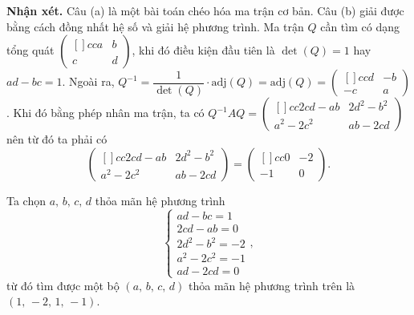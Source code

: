 \textbf{Nhận xét. }Câu (a) là một bài toán chéo hóa ma trận cơ bản. Câu (b) giải được bằng cách đồng nhất hệ số và giải hệ phương trình. Ma trận $Q$ cần tìm có dạng tổng quát $\begin{pmatrix}[]{cc}
    a & b \\
    c & d 
\end{pmatrix}$, khi đó điều kiện đầu tiên là $\det(Q) = 1$ hay $ad - bc = 1$. Ngoài ra, $Q^{-1} = \dfrac{1}{\det (Q)} \cdot \text{adj}(Q) = \text{adj}(Q) = \begin{pmatrix}[]{cc}
    d & -b \\
    -c & a 
\end{pmatrix}$. Khi đó bằng phép nhân ma trận, ta có $Q^{-1}AQ = \begin{pmatrix}[]{cc}
    2cd-ab & 2d^2-b^2 \\
    a^2-2c^2 & ab-2cd 
\end{pmatrix}$ nên từ đó ta phải có $$\begin{pmatrix}[]{cc}
    2cd-ab & 2d^2-b^2 \\
    a^2-2c^2 & ab-2cd 
\end{pmatrix} = \begin{pmatrix}[]{cc}
    0 & -2 \\
    -1 & 0 
\end{pmatrix}.$$ 

Ta chọn $a,\,b,\,c,\,d$ thỏa mãn hệ phương trình $$\begin{cases}
    ad - bc = 1 \\
    2cd - ab = 0 \\
    2d^2 - b^2 = -2 \\
    a^2 - 2c^2 = -1 \\
    ad - 2cd = 0
\end{cases},$$
từ đó tìm được một bộ $(a,\,b,\,c,\,d)$ thỏa mãn hệ phương trình trên là $(1,\,-2,\,1,\,-1)$.


